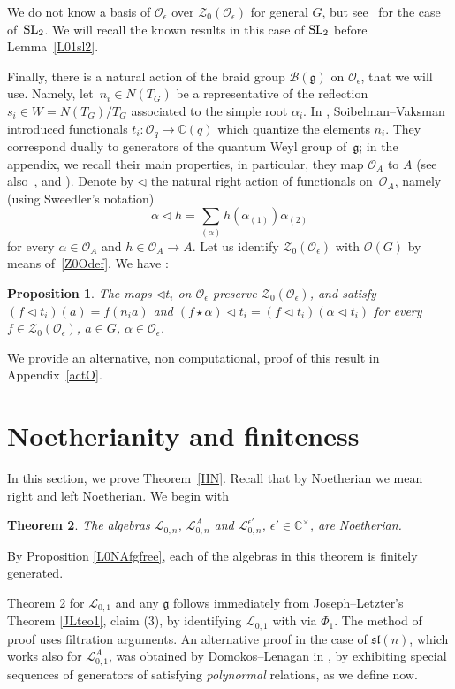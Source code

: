 \documentclass[pdftex]{sigma}
\numberwithin{equation}{section}
\newtheorem{teo}{Theorem}[section]
\newtheorem{prop}[teo]{Proposition}
\theoremstyle{definition}
\newcommand{\e}{\epsilon}
\newcommand{\ep}{{\epsilon'}}
\newcommand{\mc}{\mathbb{C}}
\newcommand{\Ll}{{\mathcal L}}
\newcommand{\Oo}{{\mathcal O}}
\newcommand{\ra}{\rightarrow}
\begin{document}
We do not know a basis of $\Oo_\e$ over $\mathcal{Z}_0(\Oo_\e)$ for general $G$, but see~\cite{DRZ} for the case of~${\rm SL}_2$. We will recall the known results in this case of ${\rm SL}_2$ before Lemma~\ref{L01sl2}.

Finally, there is a natural action of the braid group $\mathcal{B}(\mathfrak{g})$ on $\Oo_\e$, that we will use. Namely, let~${n_i\in N(T_G)}$ be a representative of the reflection $s_i\in W=N(T_G)/T_G$ associated to the simple root $\alpha_i$. In \cite{Soi,SV}, Soibelman--Vaksman introduced functionals $t_i\colon \mathcal{O}_q\ra \mc(q)$ which quantize the elements $n_i$. They correspond dually to generators of the quantum Weyl group of~$\mathfrak{g}$; in the appendix, we recall their main properties, in particular, they map $\Oo_A$ to $A$ (see also~\cite[Section~8.2]{CP}, and \cite{DC-L,KhorTol,KirRes,LS,SV}). Denote by $\lhd$ the natural right action of functionals on~$\Oo_A$, namely (using Sweedler's notation)
\[\alpha\lhd h = \sum_{(\alpha)}h(\alpha_{(1)}) \alpha_{(2)}\]
for every $\alpha\in \Oo_A$ and $h\in \Oo_A\ra A$. Let us identify $\mathcal{Z}_0(\Oo_\e)$ with $\Oo(G)$ by means of~\eqref{Z0Odef}. We have \cite[Proposition~7.1]{DC-L}:

\begin{prop} \label{funcDCL} The maps $\lhd t_i$ on $\Oo_\e$ preserve $\mathcal{Z}_0(\Oo_\e)$, and satisfy $(f\lhd t_i)(a) = f(n_ia)$ and $(f\star\alpha)\lhd t_i = (f\lhd t_i)(\alpha\lhd t_i)$ for every $f\in \mathcal{Z}_0(\Oo_\e)$, $a\in G$, $\alpha\in \mathcal{O}_\e$.
\end{prop}

We provide an alternative, non computational, proof of this result in Appendix~\ref{actO}.

\section{Noetherianity and finiteness}\label{HNsec}
In this section, we prove Theorem~\ref{HN}. Recall that by Noetherian we mean right and left Noetherian. We begin with

\begin{teo} \label{LonNoeth} The algebras ${\mathcal L}_{0,n}$, $\Ll_{0,n}^A$ and $\Ll_{0,n}^\ep$, $\ep\in \mc^\times$, are Noetherian.
\end{teo}

By Proposition \ref{L0NAfgfree}, each of the algebras in this theorem is finitely generated.

Theorem \ref{LonNoeth} for ${\mathcal L}_{0,1}$ and any $\mathfrak{g}$ follows immediately from Joseph--Letzter's Theorem \ref{JLteo1}, claim (3), by identifying ${\mathcal L}_{0,1}$ with  via $\Phi_1$. The method of proof uses filtration arguments. An alternative proof in the case of $\mathfrak{sl}(n)$, which works also for ${\mathcal L}_{0,1}^A$, was obtained by Domokos--Lenagan in \cite{DomLen}, by exhibiting special sequences of generators of  satisfying {\it polynormal} relations, as we define now.
\end{document}
